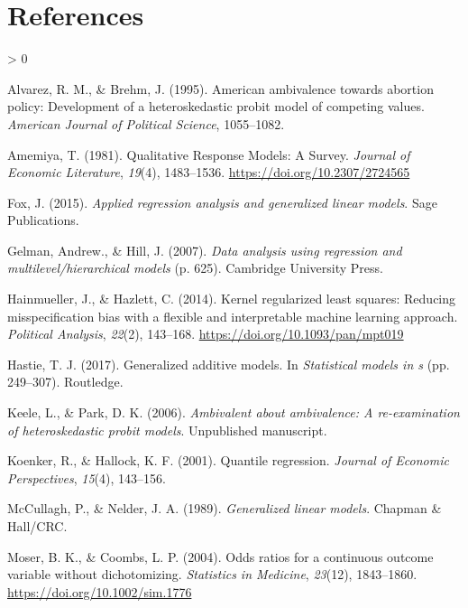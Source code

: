 \documentclass[
  english,
  doc]{apa6}
\newlength{\cslhangindent}
\newenvironment{CSLReferences}[2] %
 {%
  \setlength{\parindent}{0pt}
  \ifodd #1 \everypar{\setlength{\hangindent}{\cslhangindent}}\ignorespaces\fi
  \ifnum #2 > 0
  \setlength{\parskip}{#2\baselineskip}
  \fi
 }%
 {}
\begin{document}
\hypertarget{references}{%
\section{References}\label{references}}

\begingroup
\setlength{\parindent}{-0.5in}
\setlength{\leftskip}{0.5in}

\hypertarget{refs}{}
\begin{CSLReferences}{1}{0}
\leavevmode\hypertarget{ref-alvarez1995american}{}%
Alvarez, R. M., \& Brehm, J. (1995). American ambivalence towards abortion policy: Development of a heteroskedastic probit model of competing values. \emph{American Journal of Political Science}, 1055--1082.

\leavevmode\hypertarget{ref-Amemiya1981}{}%
Amemiya, T. (1981). {Qualitative Response Models: A Survey}. \emph{Journal of Economic Literature}, \emph{19}(4), 1483--1536. \url{https://doi.org/10.2307/2724565}

\leavevmode\hypertarget{ref-fox2015applied}{}%
Fox, J. (2015). \emph{Applied regression analysis and generalized linear models}. Sage Publications.

\leavevmode\hypertarget{ref-Gelman2007}{}%
Gelman, Andrew., \& Hill, J. (2007). \emph{{Data analysis using regression and multilevel/hierarchical models}} (p. 625). Cambridge University Press.

\leavevmode\hypertarget{ref-Hainmueller2014}{}%
Hainmueller, J., \& Hazlett, C. (2014). {Kernel regularized least squares: Reducing misspecification bias with a flexible and interpretable machine learning approach}. \emph{Political Analysis}, \emph{22}(2), 143--168. \url{https://doi.org/10.1093/pan/mpt019}

\leavevmode\hypertarget{ref-hastie2017generalized}{}%
Hastie, T. J. (2017). Generalized additive models. In \emph{Statistical models in s} (pp. 249--307). Routledge.

\leavevmode\hypertarget{ref-Keele2006}{}%
Keele, L., \& Park, D. K. (2006). \emph{{Ambivalent about ambivalence: A re-examination of heteroskedastic probit models}}. {Unpublished manuscript}.

\leavevmode\hypertarget{ref-koenker2001quantile}{}%
Koenker, R., \& Hallock, K. F. (2001). Quantile regression. \emph{Journal of Economic Perspectives}, \emph{15}(4), 143--156.

\leavevmode\hypertarget{ref-mccullagh1989nelder}{}%
McCullagh, P., \& Nelder, J. A. (1989). \emph{Generalized linear models}. Chapman {\&} Hall/CRC.

\leavevmode\hypertarget{ref-Moser2004}{}%
Moser, B. K., \& Coombs, L. P. (2004). {Odds ratios for a continuous outcome variable without dichotomizing}. \emph{Statistics in Medicine}, \emph{23}(12), 1843--1860. \url{https://doi.org/10.1002/sim.1776}

\end{CSLReferences}

\endgroup
\end{document}
